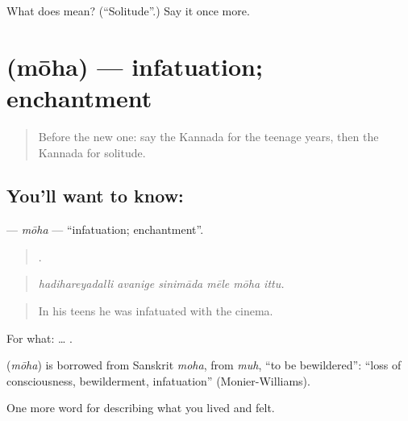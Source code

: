 \begin{tcolorbox}[breakable,colback=teal!4,colframe=teal!35!black,title={Before you move on}]
What does  mean? (\textquotedblleft{}Solitude\textquotedblright{}.) Say it once more.
\end{tcolorbox}
\section[\texorpdfstring{\kn{ಮೋಹ} (mōha)}{ಮೋಹ (mōha)}]{ (mōha) — infatuation; enchantment}

\label{lesson:KA-C529-moha}



\begin{quote}
Before the new one: say the Kannada for the teenage years, then the Kannada for solitude.
\end{quote}

\subsection*{You'll want to know: }
\textbf{} — \emph{mōha} — \textquotedblleft{}infatuation; enchantment\textquotedblright{}.

\begin{quote}
     .
\end{quote}

\begin{quote}
\emph{hadihareyadalli avanige sinimāda mēle mōha ittu.}
\end{quote}

\begin{quote}
In his teens he was infatuated with the cinema.
\end{quote}

For what: …  .

\begin{cousinweb}
\textbf{} (\emph{mōha}) is borrowed from Sanskrit \emph{moha}, from \emph{muh}, \textquotedblleft{}to be bewildered\textquotedblright{}: \textquotedblleft{}loss of consciousness, bewilderment, infatuation\textquotedblright{} (Monier-Williams).
\end{cousinweb}

\begin{grammarlens}[title={What you've built}]
One more word for describing what you lived and felt.
\end{grammarlens}

